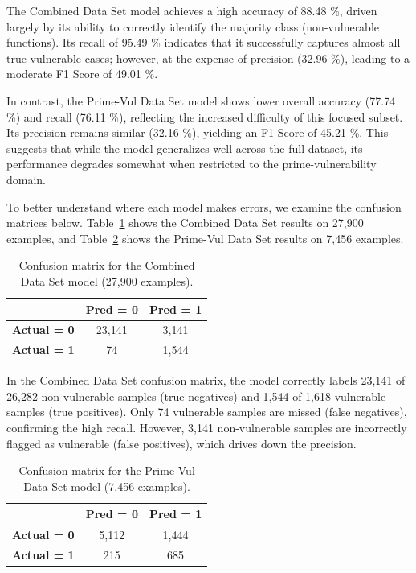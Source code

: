 \documentclass{article}
\begin{document}
\pagebreak

The Combined Data Set model achieves a high accuracy of 88.48 \%, driven largely by its ability to correctly identify the majority class (non-vulnerable functions). Its recall of 95.49 \% indicates that it successfully captures almost all true vulnerable cases; however, at the expense of precision (32.96 \%), leading to a moderate F1 Score of 49.01 \%.  

In contrast, the Prime-Vul Data Set model shows lower overall accuracy (77.74 \%) and recall (76.11 \%), reflecting the increased difficulty of this focused subset. Its precision remains similar (32.16 \%), yielding an F1 Score of 45.21 \%. This suggests that while the model generalizes well across the full dataset, its performance degrades somewhat when restricted to the prime-vulnerability domain.

To better understand where each model makes errors, we examine the confusion matrices below. Table~\ref{tab:confmat-large} shows the Combined Data Set results on 27,900 examples, and Table~\ref{tab:confmat-small} shows the Prime-Vul Data Set results on 7,456 examples.


\begin{table}[ht]
  \centering
  \begin{tabular}{c|cc}
    & \textbf{Pred = 0} & \textbf{Pred = 1} \\ \hline
  \textbf{Actual = 0} & 23,141 & 3,141 \\
  \textbf{Actual = 1} &    74  & 1,544 \\
  \end{tabular}
  \caption{Confusion matrix for the Combined Data Set model (27,900 examples).}
  \label{tab:confmat-large}
\end{table}

In the Combined Data Set confusion matrix, the model correctly labels 23,141 of 26,282 non-vulnerable samples (true negatives) and 1,544 of 1,618 vulnerable samples (true positives). Only 74 vulnerable samples are missed (false negatives), confirming the high recall. However, 3,141 non-vulnerable samples are incorrectly flagged as vulnerable (false positives), which drives down the precision.

\begin{table}[ht]
  \centering
  \begin{tabular}{c|cc}
    & \textbf{Pred = 0} & \textbf{Pred = 1} \\ \hline
  \textbf{Actual = 0} & 5,112 & 1,444 \\
  \textbf{Actual = 1} &  215  &   685 \\
  \end{tabular}
  \caption{Confusion matrix for the Prime-Vul Data Set model (7,456 examples).}
  \label{tab:confmat-small}
\end{table}
\end{document}
